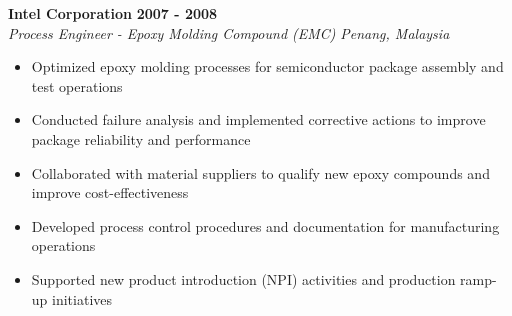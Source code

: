 \textbf{Intel Corporation} \hfill \textbf{2007 - 2008} \\
\textit{Process Engineer - Epoxy Molding Compound (EMC)} \hfill \textit{Penang, Malaysia} \\
\vspace{-0.4mm}
\begin{itemize}[leftmargin=0.5cm, label={\textbullet}]
\item Optimized epoxy molding processes for semiconductor package assembly and test operations
\item Conducted failure analysis and implemented corrective actions to improve package reliability and performance
\item Collaborated with material suppliers to qualify new epoxy compounds and improve cost-effectiveness
\item Developed process control procedures and documentation for manufacturing operations
\item Supported new product introduction (NPI) activities and production ramp-up initiatives
\end{itemize}
\vspace{0.2mm}